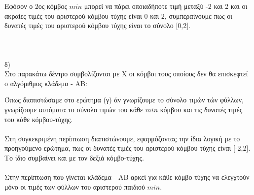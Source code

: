 \documentclass[12pt]{article}
\begin{document}
Εφόσον ο 2ος κόμβος $min$ μπορεί να πάρει οποιαδήποτε τιμή μεταξύ -2 και 2 και οι ακραίες τιμές του αριστερού κόμβου τύχης είναι 0 και 2, συμπεραίνουμε πως οι δυνατές τιμές του αριστερού κόμβου τύχης είναι το σύνολο [0,2].\\\\\\\\
δ)\\
Στο παρακάτω δέντρο συμβολίζονται με Χ οι κόμβοι τους οποίους δεν θα επισκεφτεί ο αλγόριθμος κλάδεμα - ΑΒ:\\
\begin{center}
    
\end{center}
Όπως διαπιστώσαμε στο ερώτημα (γ) άν γνωρίζουμε το σύνολο τιμών τών φύλλων, γνωρίζουμε αυτόματα το σύνολο τιμών του κάθε $min$ κόμβου και τις δυνατές τιμές του κάθε κόμβου-τύχης.\\\\
Στη συγκεκριμένη περίπτωση διαπιστώνουμε, εφαρμόζοντας την ίδια λογική με το προηγούμενο ερώτημα, πως οι δυνατές τιμές του αριστερού-κόμβου τύχης είναι [-2,2]. Το ίδιο συμβαίνει και με τον δεξιά κόμβο-τύχης.\\\\
Στην περίπτωση που γίνεται κλάδεμα - ΑΒ αρκεί για κάθε κόμβο τύχης να ελεγχτούν μόνο οι τιμές των φύλλων του αριστερού παιδιού $min$.\\\\
\end{document}
